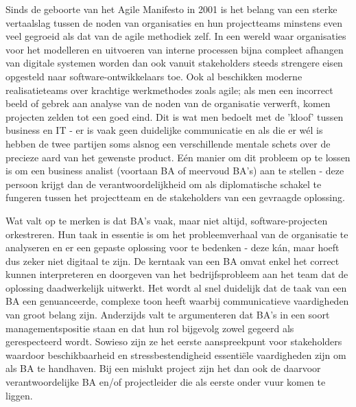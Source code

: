 \documentclass{hogent-article}
\begin{document}
Sinds de geboorte van het Agile Manifesto in 2001 is het belang van een sterke vertaalslag
tussen de noden van organisaties en hun projectteams minstens even veel gegroeid als dat
van de agile methodiek zelf. In een wereld waar organisaties voor het modelleren en uitvoeren
van interne processen bijna compleet afhangen van digitale systemen worden dan ook vanuit 
stakeholders steeds strengere eisen opgesteld naar software-ontwikkelaars toe. Ook al 
beschikken moderne realisatieteams over krachtige werkmethodes zoals agile; als
men een incorrect beeld of gebrek aan analyse van de noden van de organisatie verwerft, komen 
projecten zelden tot een goed eind. Dit is wat men bedoelt met de 'kloof' tussen business
en IT - er is vaak geen duidelijke communicatie en als die er wél is hebben de twee partijen
soms alsnog een verschillende mentale schets over de precieze aard van het gewenste product.
Eén manier om dit probleem op te lossen is om een business analist (voortaan BA of meervoud BA's) 
aan te stellen - deze persoon krijgt dan de verantwoordelijkheid om als diplomatische schakel 
te fungeren tussen het projectteam en de stakeholders van een gevraagde oplossing. 

Wat valt op te merken is dat BA's vaak, maar niet altijd, software-projecten orkestreren.
Hun taak in essentie is om het probleemverhaal van de organisatie te analyseren en 
er een gepaste oplossing voor te bedenken - deze kán, maar hoeft dus zeker niet digitaal te 
zijn. De kerntaak van een BA omvat enkel het correct kunnen interpreteren en doorgeven van het 
bedrijfsprobleem aan het team dat de oplossing daadwerkelijk uitwerkt. Het wordt al snel duidelijk
dat de taak van een BA een genuanceerde, complexe toon heeft waarbij communicatieve vaardigheden
van groot belang zijn. Anderzijds valt te argumenteren dat BA's in een soort managementspositie
staan en dat hun rol bijgevolg zowel gegeerd als gerespecteerd wordt. Sowieso zijn ze het 
eerste aanspreekpunt voor stakeholders waardoor beschikbaarheid en stressbestendigheid essentiële 
vaardigheden zijn om als BA te handhaven. Bij een mislukt project zijn het dan ook de daarvoor 
verantwoordelijke BA en/of projectleider die als eerste onder vuur komen te liggen.
\end{document}
